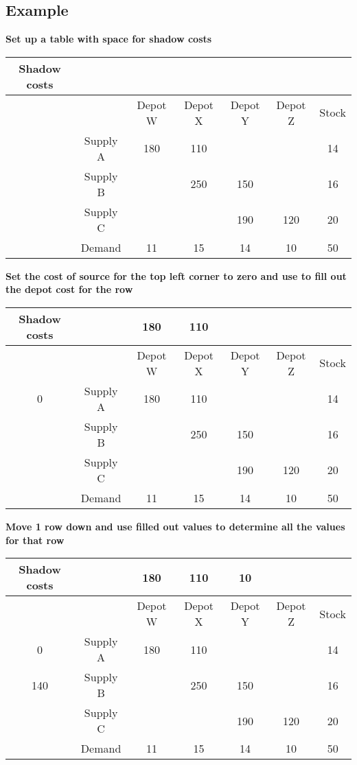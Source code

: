 \documentclass{article}[18pt]
\newcommand{\cred}[1]{\color{red}#1}
\begin{document}
\subsection{Example}
\textbf{Set up a table with space for shadow costs}\\
\begin{center}
\begin{tabular}{ |c|c|c|c|c|c|c| }
\hline
Shadow costs&&&&&&\\
\hline
&&Depot W&Depot X&Depot Y&Depot Z&Stock\\
\hline
&Supply A&\cred{180}&\cred{110}&&&14\\
\hline
&Supply B&&\cred{250}&\cred{150}&&16\\
\hline
&Supply C&&&\cred{190}&\cred{120}&20\\
\hline
&Demand&11&15&14&10&50\\
\hline
\end{tabular}
\end{center}
\textbf{Set the cost of source for the top left corner to zero and use to fill out the depot cost for the row}\\
\begin{center}
\begin{tabular}{ |c|c|c|c|c|c|c| }
\hline
Shadow costs&&180&110&&&\\
\hline
&&Depot W&Depot X&Depot Y&Depot Z&Stock\\
\hline
0&Supply A&\cred{180}&\cred{110}&&&14\\
\hline
&Supply B&&\cred{250}&\cred{150}&&16\\
\hline
&Supply C&&&\cred{190}&\cred{120}&20\\
\hline
&Demand&11&15&14&10&50\\
\hline
\end{tabular}
\end{center}
\textbf{Move 1 row down and use filled out values to determine all the values for that row}
\begin{center}
\begin{tabular}{ |c|c|c|c|c|c|c| }
\hline
Shadow costs&&180&110&10&&\\
\hline
&&Depot W&Depot X&Depot Y&Depot Z&Stock\\
\hline
0&Supply A&\cred{180}&\cred{110}&&&14\\
\hline
140&Supply B&&\cred{250}&\cred{150}&&16\\
\hline
&Supply C&&&\cred{190}&\cred{120}&20\\
\hline
&Demand&11&15&14&10&50\\
\hline
\end{tabular}
\end{center}
\end{document}

